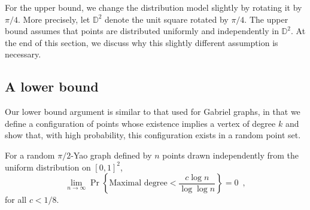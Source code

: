 \documentclass[lotsofwhite,charterfonts]{patmorin}
\newcommand{\D}{\mathbb{D}}
\begin{document}
For the upper bound, we change the distribution model slightly by rotating
it by $\pi/4$.  More precisely, let $\D^2$ denote the unit square rotated
by $\pi/4$.  The upper bound assumes that points are distributed uniformly
and independently in $\D^2$. At the end of this section, we discuss why
this slightly different assumption is necessary.

\subsection{A lower bound}

Our lower bound argument is similar to that used for Gabriel graphs, in
that we define a configuration of points whose existence implies a vertex
of degree $k$ and show that, with high probability, this configuration
exists in a random point set.  

\begin{thm}
For a random $\pi/2$-Yao graph defined by $n$ points drawn independently
from the uniform distribution on $[0,1]^2$,
\[
   \lim_{n\rightarrow\infty}
     \Pr\left\{\mbox{Maximal degree} < \frac{c\log n}{\log\log n} \right\} 
       = 0 \enspace ,
\]
for all $c < 1/8$.
\end{thm}
\end{document}
